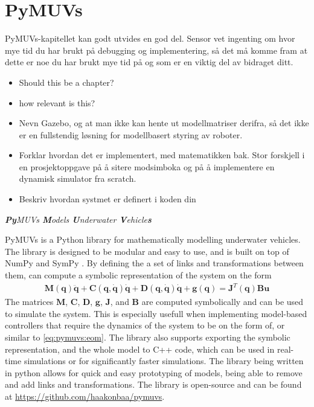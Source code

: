 \chapter{PyMUVs}

{
\color{red}
PyMUVs-kapitellet kan godt utvides en god del. Sensor vet ingenting om hvor mye tid du har brukt på debugging og implementering, så det må komme fram at dette er noe du har brukt mye tid på og som er en viktig del av bidraget ditt.
\begin{itemize}
    \item Should this be a chapter?
    \item how relevant is this?
    \item Nevn Gazebo, og at man ikke kan hente ut modellmatriser derifra, så det ikke er en fullstendig løsning for modellbasert styring av roboter.
    \item Forklar hvordan det er implementert, med matematikken bak. Stor forskjell i en prosjektoppgave på å sitere modsimboka og på å implementere en dynamisk simulator fra scratch.
    \item Beskriv hvordan systmet er definert i koden din
\end{itemize}
}

\emph{\textbf{Py}MUVs \textbf{M}odels \textbf{U}nderwater \textbf{V}ehicle\textbf{s}}
\newline

PyMUVs is a Python library for mathematically modelling underwater vehicles. The
library is designed to be modular and easy to use, and is built on top of NumPy
\cite{numpy} and SymPy \cite{sympy}. By defining the a set of links and transformations
between them, \pymuvs can compute a symbolic representation of the system on the
form
\begin{align}
    \bm{M}(\bm{q}) \ddot{\bm{q}} + \bm{C}(\bm{q}, \dot{\bm{q}}) \dot{\bm{q}} +
    \bm{D}(\bm{q}, \dot{\bm{q}}) \dot{\bm{q}} + \bm{g}(\bm{q}) = \bm{J}^T(\bm{q}) \bm{B} \bm{u}
    \label{eq:pymuvs:eom}
\end{align}
The matrices $\bm{M}$, $\bm{C}$, $\bm{D}$, $\bm{g}$, $\bm{J}$, and $\bm{B}$ are
computed symbolically and can be used to simulate the system. This is especially
usefull when implementing model-based controllers that require the dynamics of the
system to be on the form of, or similar to \autoref{eq:pymuvs:eom}. The library
also supports exporting the symbolic representation, and the whole model to C++
code, which can be used in real-time simulations or for significantly faster
simulations. The library being written in python allows for quick and easy
prototyping of models, being able to remove and add links and transformations.
The library is open-source and can be found at
\url{https://github.com/haakonbaa/pymuvs}. 

